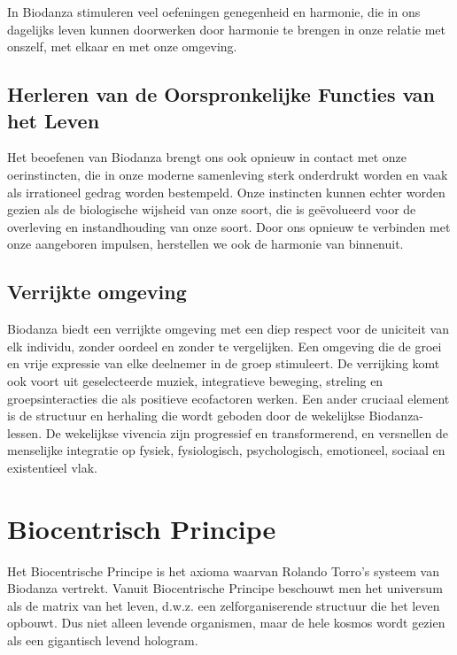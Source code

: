 \documentclass[
  11pt,
]{book}
\begin{document}
In Biodanza stimuleren veel oefeningen genegenheid en harmonie, die in ons dagelijks leven kunnen doorwerken door harmonie te brengen in onze relatie met onszelf, met elkaar en met onze omgeving.

\hypertarget{herleren-van-de-oorspronkelijke-functies-van-het-leven}{%
\subsection{Herleren van de Oorspronkelijke Functies van het Leven}\label{herleren-van-de-oorspronkelijke-functies-van-het-leven}}

Het beoefenen van Biodanza brengt ons ook opnieuw in contact met onze oerinstincten, die in onze moderne samenleving sterk onderdrukt worden en vaak als irrationeel gedrag worden bestempeld. Onze instincten kunnen echter worden gezien als de biologische wijsheid van onze soort, die is geëvolueerd voor de overleving en instandhouding van onze soort. Door ons opnieuw te verbinden met onze aangeboren impulsen, herstellen we ook de harmonie van binnenuit.

\hypertarget{verrijkte-omgeving}{%
\subsection{Verrijkte omgeving}\label{verrijkte-omgeving}}

Biodanza biedt een verrijkte omgeving met een diep respect voor de uniciteit van elk individu, zonder oordeel en zonder te vergelijken. Een omgeving die de groei en vrije expressie van elke deelnemer in de groep stimuleert. De verrijking komt ook voort uit geselecteerde muziek, integratieve beweging, streling en groepsinteracties die als positieve ecofactoren werken. Een ander cruciaal element is de structuur en herhaling die wordt geboden door de wekelijkse Biodanza-lessen. De wekelijkse vivencia zijn progressief en transformerend, en versnellen de menselijke integratie op fysiek, fysiologisch, psychologisch, emotioneel, sociaal en existentieel vlak.

\hypertarget{sectionBiocentricPrinciple}{%
\section{Biocentrisch Principe}\label{sectionBiocentricPrinciple}}

Het Biocentrische Principe is het axioma waarvan Rolando Torro's systeem van Biodanza vertrekt. Vanuit Biocentrische Principe beschouwt men het universum als de matrix van het leven, d.w.z. een zelforganiserende structuur die het leven opbouwt. Dus niet alleen levende organismen, maar de hele kosmos wordt gezien als een gigantisch levend hologram.
\end{document}
